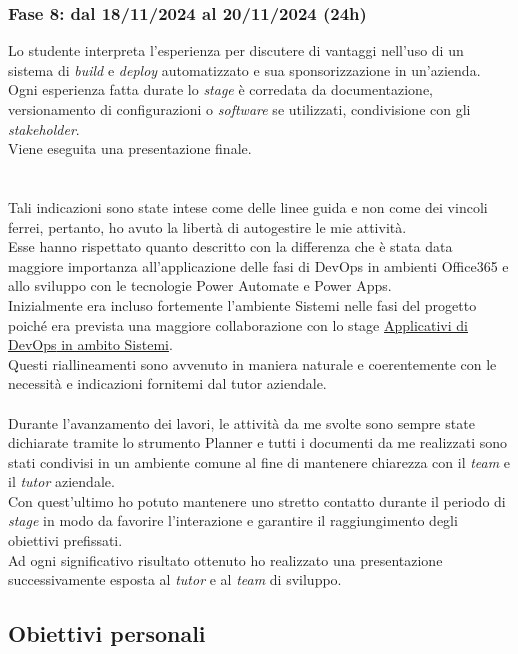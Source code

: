 \subsubsection*{Fase 8: dal 18/11/2024 al 20/11/2024 (24h) }
Lo studente interpreta l'esperienza per discutere di vantaggi nell'uso di un sistema di \emph{build} e \emph{deploy} automatizzato e sua sponsorizzazione in un'azienda. Ogni esperienza fatta durate lo \emph{stage} è corredata da documentazione, versionamento di configurazioni o \emph{software} se utilizzati, condivisione con gli \emph{stakeholder}.\\
Viene eseguita una presentazione finale.\\\\\\
Tali indicazioni sono state intese come delle linee guida e non come dei vincoli ferrei, pertanto, ho avuto la libertà di autogestire le mie attività.\\
Esse hanno rispettato quanto descritto con la differenza che è stata data maggiore importanza all'applicazione delle fasi di \gls{DevOps} in ambienti Office365 e allo sviluppo con le tecnologie Power Automate e Power Apps.\\
Inizialmente era incluso fortemente l'ambiente \gls{Sistemi} nelle fasi del progetto poiché era prevista una maggiore collaborazione con lo stage \hyperref[stageDavide]{Applicativi di \gls{DevOps} in ambito Sistemi}.\\
Questi riallineamenti sono avvenuto in maniera naturale e coerentemente con le necessità e indicazioni fornitemi dal tutor aziendale.\\\\
Durante l'avanzamento dei lavori, le attività da me svolte sono sempre state dichiarate tramite lo strumento Planner e tutti i documenti da me realizzati sono stati condivisi in un ambiente comune al fine di mantenere chiarezza con il \emph{team} e il \emph{tutor} aziendale.\\
Con quest'ultimo ho potuto mantenere uno stretto contatto durante il periodo di \emph{stage} in modo da favorire l'interazione e garantire il raggiungimento degli obiettivi prefissati.\\
Ad ogni significativo risultato ottenuto ho realizzato una presentazione successivamente esposta al \emph{tutor} e al \emph{team} di sviluppo.\\

\subsection{Obiettivi personali}
%

